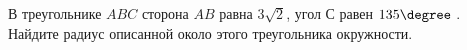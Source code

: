 \begin{ex}
	\begin{condition}
		 В треугольнике \( ABC \)  сторона \( AB  \) равна \( 3\sqrt{2} \), угол \( С \)  равен \( 135\degree\) . Найдите радиус описанной около этого треугольника окружности.
	\end{condition}
\end{ex}